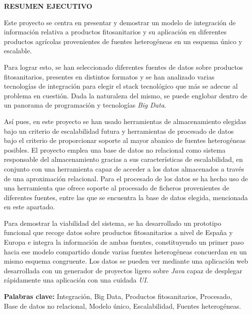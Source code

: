 \begin{center}

{\Large \bfseries RESUMEN EJECUTIVO}

\vspace{1.5cm}
\end{center}


Este proyecto se centra en presentar y demostrar un modelo de integración de información relativa a productos fitosanitarios y su aplicación en diferentes productos agrícolas provenientes de fuentes heterogéneas en un esquema único y escalable. \par
Para lograr esto, se han seleccionado diferentes fuentes de datos sobre productos fitosanitarios, presentes en distintos formatos y se han analizado varias tecnologías de integración para elegir el stack tecnológico que más se adecue al problema en cuestión. Dada la naturaleza del mismo, se puede englobar dentro de un panorama de programación y tecnologías \textit{Big Data}.
\par
Así pues, en este proyecto se han usado herramientas de almacenamiento elegidas bajo un criterio de escalabilidad futura y herramientas de procesado de datos bajo el criterio de proporcionar soporte al mayor abanico de fuentes heterogéneas posibles. El proyecto emplea una base de datos no relacional como sistema responsable del almacenamiento gracias a sus características de escalabilidad, en conjunto con una herramienta capaz de acceder a los datos almacenados a través de una aproximación relacional. Para el procesado de los datos se ha hecho uso de una herramienta que ofrece soporte al procesado de ficheros provenientes de diferentes fuentes, entre las que se encuentra la base de datos elegida, mencionada en este apartado.\par
Para demostrar la viabilidad del sistema, se ha desarrollado un prototipo funcional que recoge datos sobre productos fitosanitarios a nivel de España y Europa e integra la información de ambas fuentes, constituyendo un primer paso hacia ese modelo compartido donde varias fuentes heterogéneas concuerdan en un mismo esquema congruente. Los datos se pueden ver mediante una aplicación web desarrollada con un generador de proyectos ligero sobre \textit{Java} capaz de desplegar rápidamente una aplicación con una cuidada \textit{UI}.  \\\par

\textbf{Palabras clave:} Integración, Big Data, Productos fitosanitarios, Procesado, Base de datos no relacional, Modelo único, Escalabilidad, Fuentes heterogéneas.
